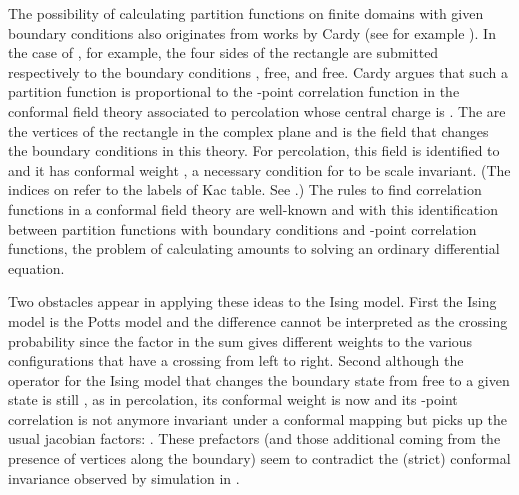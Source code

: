 \documentclass[a4paper,12pt]{article}
\begin{document}
The possibility of calculating partition functions on finite domains
with given boundary conditions also originates from works by Cardy (see for
example \cite{C2}).
In the case of \coordHE{}, for example, the four sides of the rectangle
are submitted respectively to the boundary conditions \myHighlight{$\alpha$}\coordHE{}, free,
\myHighlight{$\beta$}\coordHE{} and free. Cardy argues that such a partition function is proportional
to the \coordHE{}-point correlation function \coordHE{} in the conformal field theory associated to percolation
whose central charge is \coordHE{}. The \coordHE{} are the vertices of the
rectangle in the complex plane and \myHighlight{$\phi$}\coordHE{} is the field that changes the
boundary conditions in this theory. For percolation, this field is 
identified to \coordHE{} and it has conformal weight \coordHE{}, a necessary
condition for \coordHE{} to be scale invariant. (The indices on \coordHE{}
refer to the labels of Kac table. See \cite{dFMS}.) The rules to find
correlation functions in a conformal field theory are well-known and
with this identification between partition functions with boundary conditions
and \coordHE{}-point correlation functions, the problem of calculating \coordHE{} amounts
to solving an ordinary differential equation.

Two obstacles appear in applying these ideas to the Ising model. First the
Ising model is the \coordHE{} Potts model and the difference \coordHE{} cannot be interpreted as the crossing probability
since the factor \coordHE{} in the sum gives different weights to the various
configurations that have a crossing from left to right. Second although 
the operator
for the Ising model that changes the boundary state from free to a given state
\myHighlight{$\alpha$}\coordHE{} is still \coordHE{}, as in percolation, its conformal weight
\coordHE{} is now \coordHE{} and its \coordHE{}-point correlation is not anymore 
invariant under a conformal mapping \coordHE{} but picks up the usual
jacobian factors: \coordHE{}. These prefactors (and those additional coming from
the presence of vertices along the boundary) seem to contradict the (strict)
conformal invariance observed by simulation in \cite{LLS}.
\end{document}
